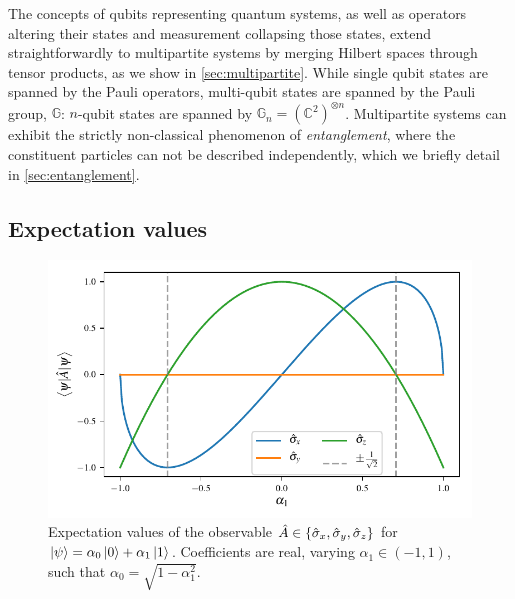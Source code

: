 The concepts of qubits representing quantum systems, as well as operators
    altering their states and measurement collapsing those states,
    extend straightforwardly to multipartite systems by merging Hilbert spaces through tensor products, 
    as we show in \cref{sec:multipartite}.
While single qubit states are spanned by the Pauli operators, multi-qubit states are spanned by the Pauli group, $\mathbb{G}$: 
    $n$-qubit states are spanned by $\mathbb{G}_n = \left(\mathbb{C}^2\right)^{\otimes n}$.
Multipartite systems can exhibit the strictly non-classical phenomenon of \emph{entanglement}, 
    where the constituent particles can not be described independently, 
    which we briefly detail in \cref{sec:entanglement}. 

\subsection{Expectation values}\label{sec:expectation_value}
\begin{figure}
    \begin{center}
        \includegraphics{contextual_review/figures/expectation_values.pdf}
    \end{center}
    \caption[Expectation values]{
        Expectation values of the observable $\hat{A} \in \{ \hat{\sigma}_{x}, \hat{\sigma}_{y}, \hat{\sigma}_{z}\}$ 
            for $\ket{\psi} = \alpha_0 \ket{0} + \alpha_1 \ket{1}$.
            Coefficients are real, varying $\alpha_1 \in \left( -1, 1\right)$, such that $\alpha_0 = \sqrt{1 - \alpha_1^2}$. 
    }
    \label{fig:expectation_values}
\end{figure}

